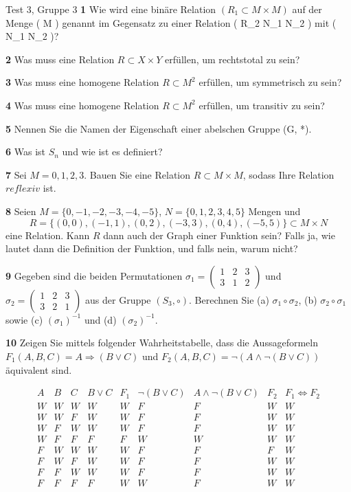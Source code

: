 \documentclass[11pt]{article}
\begin{document}
Test 3, Gruppe 3
    \textbf{1} Wie wird eine binäre Relation $( R_1 \subset M \times M )$ auf der Menge ( M ) genannt im Gegensatz zu einer Relation ( R_2 \subset N_1 \times N_2 ) mit ( N_1 \neq N_2 )?

    \textbf{2} Was muss eine Relation \( R \subset X \times Y \) erfüllen, um rechtstotal zu sein?

    \textbf{3} Was muss eine homogene Relation \( R \subset M^2 \) erfüllen, um symmetrisch zu sein?

    \textbf{4} Was muss eine homogene Relation \( R \subset M^2 \) erfüllen, um transitiv zu sein?

    \textbf{5} Nennen Sie die Namen der Eigenschaft einer abelschen Gruppe (G, *).

    \textbf{6} Was ist $S_n$ und wie ist es definiert?

    \textbf{7} Sei $M = {0,1,2,3}$. Bauen Sie eine Relation $R \subset M \times M$, sodass Ihre Relation $reflexiv$ ist.

    \textbf{8} Seien \( M = \{0,-1,-2,-3,-4,-5\} \), \( N = \{0,1,2,3,4,5\} \) Mengen und
    \[ R = \{(0,0),(-1,1),(0,2),(-3,3),(0,4),(-5,5)\} \subset M \times N \]
    eine Relation. Kann \( R \) dann auch der Graph einer Funktion sein? Falls ja, wie lautet dann die Definition der Funktion, und falls nein, warum nicht?

    \textbf{9} Gegeben sind die beiden Permutationen \(\sigma_{1} = \begin{pmatrix} 1 & 2 & 3 \\ 3 & 1 & 2 \end{pmatrix}\) und \(\sigma_{2} = \begin{pmatrix} 1 & 2 & 3 \\ 3 & 2 & 1 \end{pmatrix}\) aus der Gruppe \( (S_3, \circ) \). Berechnen Sie (a) \(\sigma_{1} \circ \sigma_{2}\), (b) \(\sigma_{2} \circ \sigma_{1}\) sowie (c) \((\sigma_{1})^{-1}\) und (d) \((\sigma_{2})^{-1}\).

    \textbf{10} Zeigen Sie mittels folgender Wahrheitstabelle, dass die Aussageformeln \(F_1(A,B,C) = A \Rightarrow (B \lor C)\) und \(F_2(A,B,C) = \neg(A \land \neg(B \lor C))\) äquivalent sind.

\[
    \begin{array}{ccc|c|c|c|c|c|c}
        A & B & C & B \lor C & F_1 & \neg(B \lor C) & A \land \neg(B \lor C) & F_2 & F_1 \Leftrightarrow F_2 \\
        \hline
        W & W & W & W & W & F & F & W & W \\
        W & W & F & W & W & F & F & W & W \\
        W & F & W & W & W & F & F & W & W \\
        W & F & F & F & F & W & W & W & W \\
        F & W & W & W & W & F & F & F & W \\
        F & W & F & W & W & F & F & W & W \\
        F & F & W & W & W & F & F & W & W \\
        F & F & F & F & W & W & F & W & W \\
    \end{array}
\]
\end{document}
